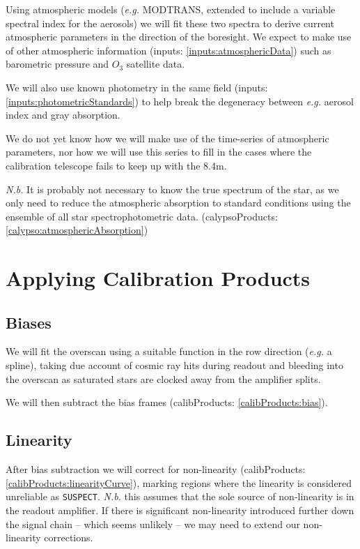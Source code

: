\documentclass[12pt]{article}
\newcommand{\eg}{\textit{e.g.}\xspace}
\newcommand{\Nb}{\textit{N.b.}\xspace}
\newcommand{\inputData}[1]{(inputs: \ref{inputs:#1})}
\newcommand{\outputData}[1]{(calibProducts: \ref{calibProducts:#1})}
\newcommand{\calypsoData}[1]{(calypsoProducts: \ref{calypso:#1})}
\begin{document}
Using atmospheric models (\eg MODTRANS, extended to include a variable spectral index for the aerosols)
we will fit these two spectra to derive current atmospheric parameters in the direction of the boresight.
We expect to make use of other atmospheric information \inputData{atmosphericData} such as barometric pressure
and $O_3$ satellite data.

We will also use known photometry in the same field \inputData{photometricStandards} to help break the
degeneracy between \eg aerosol index and gray absorption.

We do not yet know how we will make use of the time-series of atmospheric parameters, nor how we will
use this series to fill in the cases where the calibration telescope fails to keep up with the 8.4m.

\Nb It is probably not necessary to know the true spectrum of the star, as we only need to reduce the
atmospheric absorption to standard conditions using the ensemble of all star spectrophotometric data.
\calypsoData{atmosphericAbsorption}

\section{Applying Calibration Products}

\subsection{Biases}

We will fit the overscan using a suitable function in the row direction (\eg a spline), taking
due account of cosmic ray hits during readout and bleeding into the overscan as saturated
stars are clocked away from the amplifier splits.

We will then subtract the bias frames \outputData{bias}.

\subsection{Linearity}

After bias subtraction we will correct for non-linearity \outputData{linearityCurve}, marking
regions where the linearity is considered unreliable as \texttt{SUSPECT}.
\Nb this assumes that the sole
source of non-linearity is in the readout amplifier.  If there is significant non-linearity
introduced further down the signal chain -- which seems unlikely -- we may need to extend
our non-linearity corrections.
\end{document}

